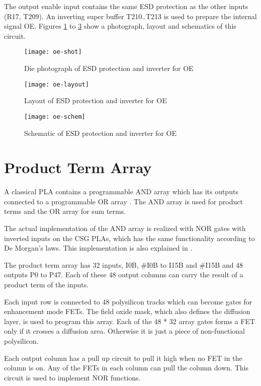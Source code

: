 The output enable input contains the same ESD protection as the other inputs
(R17, T209). An inverting super buffer T210..T213 is used to prepare the
internal signal OE. Figures \ref{fig:oe-shot} to \ref{fig:oe-schem} show
a photograph, layout and schematics of this circuit.

\begin{figure}[htb]
    \centering
    \texttt{[image: oe-shot]}
    \caption{Die photograph of ESD protection and inverter for OE}
    \label{fig:oe-shot}
\end{figure}

\begin{figure}[htbp]
    \centering
    \texttt{[image: oe-layout]}
    \caption{Layout of ESD protection and inverter for OE}
    \label{fig:oe-layout}
\end{figure}

\begin{figure}[htbp]
    \centering
    \texttt{[image: oe-schem]}
    \caption{Schematic of ESD protection and inverter for OE}
    \label{fig:oe-schem}
\end{figure}

\clearpage
\section{Product Term Array}

A classical PLA contains a programmable AND array which has its outputs
connected to a programmable OR array \cite{Maini07}. The AND array is used for
product terms and the OR array for sum terms.

The actual implementation of the AND array is realized with NOR gates with
inverted inputs on the CSG PLAs, which has the same functionality according
to De Morgan's laws. This implementation is also explained in \cite{Mead79}.

The product term array has 32 inputs, I0B, \#I0B to I15B and \#I15B and 48
outputs P0 to P47. Each of these 48 output columns can carry the result
of a product term of the inputs.

Each input row is connected to 48 polysilicon tracks which can become gates
for enhancement mode FETs. The field oxide mask, which also defines the
diffusion layer, is used to program this array. Each of the 48 * 32 array
gates forms a FET only if it crosses a diffusion area. Otherwise it is just
a piece of non-functional polysilicon.

Each output column has a pull up circuit to pull it high when no FET in the
column is on. Any of the FETs in each column can pull the column down.
This circuit is used to implement NOR functions.


